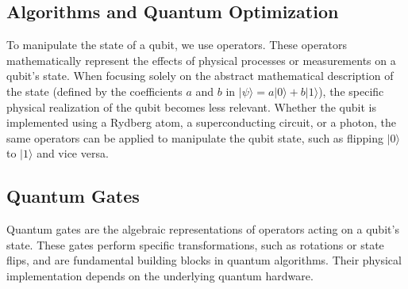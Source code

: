 \documentclass{article}
\begin{document}
\begin{multicols}{2}
\section{Algorithms and Quantum Optimization}





To manipulate the state of a qubit, we use operators. These operators mathematically represent the effects of physical processes or measurements on a qubit's state. When focusing solely on the abstract mathematical description of the state (defined by the coefficients \(a\) and \(b\) in \(|\psi\rangle = a|0\rangle + b|1\rangle\)), the specific physical realization of the qubit becomes less relevant. Whether the qubit is implemented using a Rydberg atom, a superconducting circuit, or a photon, the same operators can be applied to manipulate the qubit state, such as flipping \(|0\rangle\) to \(|1\rangle\) and vice versa.

\subsection{Quantum Gates}

Quantum gates are the algebraic representations of operators acting on a qubit's state. These gates perform specific transformations, such as rotations or state flips, and are fundamental building blocks in quantum algorithms. Their physical implementation depends on the underlying quantum hardware.


\end{multicols}
\end{document}
